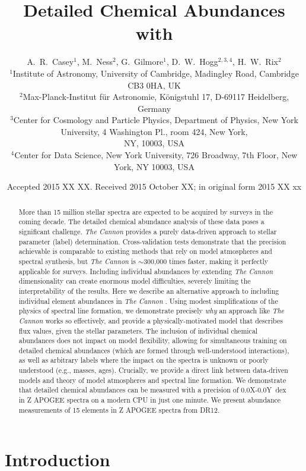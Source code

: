 \documentclass[useAMS,usenatbib]{mn2e}
\title[Cannon Chemistry]{Detailed Chemical Abundances with \tc}
\author[Casey et al.]{A.~R.~Casey$^1$, M.~Ness$^2$, G.~Gilmore$^1$,
    D.~W.~Hogg$^{2,3,4}$, H.~W.~Rix$^2$ \\ 
$^1$Institute of Astronomy, University of Cambridge, Madingley Road, Cambridge
    CB3 0HA, UK\\
$^2$Max-Planck-Institut f\"ur Astronomie, K\"onigstuhl 17, D-69117 Heidelberg,
    Germany\\
$^3$Center for Cosmology and Particle Physics, Department of Physics, New York
    University, 4 Washington Pl., room 424, New York, \\
    NY, 10003, USA\\
$^4$Center for Data Science, New York University, 726 Broadway, 7th Floor,
    New York, NY 10003, USA}
\newcommand\tc{\textit{The Cannon} }
\begin{document}
\date{Accepted 2015 XX XX. Received 2015 October XX; in original form 2015 XX xx}

\pagerange{\pageref{firstpage}--\pageref{lastpage}} 

\maketitle

\label{firstpage}

\begin{abstract}
More than 15 million stellar spectra are expected to be acquired by surveys in
the coming decade. The detailed chemical abundance analysis of these data poses
a significant challenge. \tc provides a purely data-driven
approach to stellar parameter (label) determination. Cross-validation tests
demonstrate that the precision achievable is comparable to existing methods that
rely on model atmospheres and spectral synthesis, but \tc is $\sim$300,000 times
faster, making it perfectly applicable for surveys. Including individual abundances by extending \tc dimensionality can create enormous model difficulties, severely limiting the interpretability of the results. Here
we describe an alternative approach to including individual element abundances
in \tc. Using modest simplifications of the physics of spectral line formation,
we demonstrate precisely \textit{why} an approach like \tc works so effectively,
and provide a physically-motivated model that describes flux values, given the
stellar parameters. The inclusion of individual chemical abundances does not
impact on model flexibility, allowing for simultaneous training on detailed
chemical abundances (which are formed through well-understood interactions), as well as arbitrary labels where the impact on the spectra
is unknown or poorly understood (e.g., masses, ages). Crucially, we provide a direct link
between data-driven models and theory of model atmospheres and spectral line formation. We demonstrate that
detailed chemical abundances can be measured with a precision of 0.0X-0.0Y~dex
in Z APOGEE spectra on a modern CPU in just one minute. We present abundance
measurements of 15 elements in Z APOGEE spectra from DR12.
\end{abstract}

\begin{keywords}
\end{keywords}

\section{Introduction}
\end{document}
